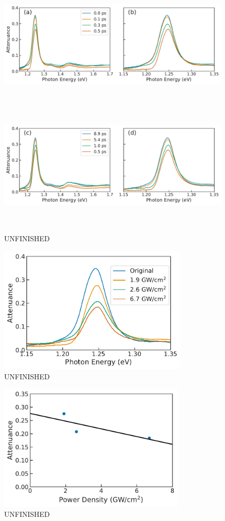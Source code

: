 \begin{figure}[ht]%
	\centering
	{\includegraphics[height=2.4in]{images/chapter_my_data/Jan_CNT_ABS_1mW_decay} }
	{\includegraphics[height=2.4in]{images/chapter_my_data/Jan_CNT_ABS_1mW_recovery} }
	\caption{{\color{red} UNFINISHED}}
\end{figure}

\begin{figure}[ht]
	\centering
	\includegraphics[height=2.4in]{images/chapter_my_data/Jan_CNT_max_abs_change}
	\caption{{\color{red} UNFINISHED}}
\end{figure}

\begin{figure}[ht]
	\centering
	\includegraphics[height=2.4in]{images/chapter_my_data/Jan_CNT_max_attenuance_and_fit}
	\caption{{\color{red} UNFINISHED}}
\end{figure}


